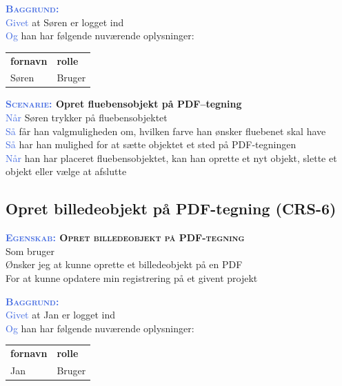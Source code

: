 \textsc{\textcolor{RoyalBlue}{\textbf{Baggrund:}}}\\
\textcolor{RoyalBlue}{Givet} at Søren er logget ind\\
\textcolor{RoyalBlue}{Og} han har følgende nuværende oplysninger:\\
\begin{tabular}{| l | l |}
	\textbf{fornavn} & \textbf{rolle} \\
	Søren & Bruger\\
\end{tabular}

\textbf{\textsc{\textcolor{RoyalBlue}{Scenarie:}} Opret fluebensobjekt på PDF--tegning}\\
\textcolor{RoyalBlue}{Når} Søren trykker på fluebensobjektet\\
\textcolor{RoyalBlue}{Så}  får han valgmuligheden om, hvilken farve han ønsker fluebenet skal have\\
\textcolor{RoyalBlue}{Så}  har han mulighed for at sætte objektet et sted på PDF-tegningen\\
\textcolor{RoyalBlue}{Når} han har placeret fluebensobjektet, kan han oprette et nyt objekt, slette et objekt eller vælge at afslutte \\

\subsection{Opret billedeobjekt på PDF-tegning (CRS-6)} \label{sec:USOpretBillede}
\textbf{\textsc{\textcolor{RoyalBlue}{Egenskab:} Opret billedeobjekt på PDF-tegning}}\\
Som bruger\\
Ønsker jeg at kunne oprette et billedeobjekt på en PDF\\
For at kunne opdatere min registrering på et givent projekt \\

\clearpage

\textsc{\textcolor{RoyalBlue}{\textbf{Baggrund:}}}\\
\textcolor{RoyalBlue}{Givet} at Jan er logget ind\\
\textcolor{RoyalBlue}{Og} han har følgende nuværende oplysninger:\\
\begin{tabular}{| l | l |}
	\textbf{fornavn} & \textbf{rolle} \\
	Jan & Bruger\\
\end{tabular}

